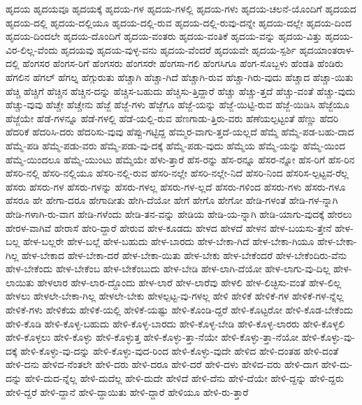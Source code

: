 {ಹೃದಯ
ಹೃದಯವೂ
ಹೃದಯಕ್ಕೆ
ಹೃದಯ-ಗಳ
ಹೃದಯ-ಗಳಲ್ಲಿ
ಹೃದಯ-ಗಳು
ಹೃದಯ-ಚಲನೆ-ಯೊಂದಿಗೆ
ಹೃದಯದ
ಹೃದಯ-ದಲ್ಲಿ
ಹೃದಯ-ದಲ್ಲಿಯೂ
ಹೃದಯ-ದಲ್ಲಿ-ರುವ
ಹೃದಯ-ದಲ್ಲಿ-ರುವು-ದನ್ನೇ
ಹೃದಯ-ದಲ್ಲೇ
ಹೃದಯ-ದಿಂದ
ಹೃದಯ-ದಿಂದಲೇ
ಹೃದಯ-ದೊಂದಿಗೆ
ಹೃದಯ-ವಂತರು
ಹೃದಯ-ವಂತಿಕೆ
ಹೃದಯ-ವನ್ನು
ಹೃದಯ-ವಿತ್ತು
ಹೃದಯ-ವಿರ-ಲಿಲ್ಲ-ವೆಂದು
ಹೃದಯವು
ಹೃದಯ-ವುಳ್ಳ-ವನು
ಹೃದಯ-ವೆಂದರೆ
ಹೃದಯವೇ
ಹೃದಯ-ಸ್ಪರ್ಶಿ
ಹೃದಯಾಂತರಾಳ-ದಲ್ಲಿ
ಹೆಂಗಸರ
ಹೆಂಗಸ-ರಿಗೆ
ಹೆಂಗಸರು
ಹೆಂಗಸರೇ
ಹೆಂಗಸಾ-ಗಲಿ
ಹೆಂಗಸಿಗೂ
ಹೆಂಗ-ಸೊಬ್ಬಳು
ಹೆಂಡತಿ
ಹೆಂಡಿರು
ಹೆಗಲಿನ
ಹೆಗಲ್
ಹೆಗಲ್ನ
ಹೆಗ್ಗುರುತು
ಹೆಚ್ಚಾಗಿ
ಹೆಚ್ಚಾ-ಗಿದೆ
ಹೆಚ್ಚಾಗಿ-ರುವ
ಹೆಚ್ಚಾ-ಗಿರು-ವುದು
ಹೆಚ್ಚಾದ
ಹೆಚ್ಚಾ-ಯಿತು
ಹೆಚ್ಚಿ
ಹೆಚ್ಚಿಗೆ
ಹೆಚ್ಚಿನ
ಹೆಚ್ಚಿನ-ದನ್ನು
ಹೆಚ್ಚಿಸ-ಬಹುದು
ಹೆಚ್ಚಿಸು-ತ್ತಿದ್ದಾರೆ
ಹೆಚ್ಚು
ಹೆಚ್ಚು-ತ್ತದೆ
ಹೆಚ್ಚು-ವಂತೆ
ಹೆಚ್ಚು-ವುದು
ಹೆಚ್ಚು-ವುವು
ಹೆಚ್ಚೇ
ಹೆಚ್ಚೇನು
ಹೆಜ್ಜೆ
ಹೆಜ್ಜೆ-ಗಳು
ಹೆಜ್ಜೆಗೂ
ಹೆಜ್ಜೆ-ಯನ್ನು
ಹೆಜ್ಜೆ-ಯಿಟ್ಟಿ-ರುವ
ಹೆಜ್ಜೆ-ಯಿಡಿಸಿ
ಹೆಜ್ಜೆಯೂ
ಹೆಜ್ಜೆಯೇ
ಹೆಡೆ-ಗಳನ್ನೂ
ಹೆಡೆ-ಗಳಲ್ಲಿ
ಹೆಡೆ-ಯಲ್ಲಿ-ರುವ
ಹೆಣಗಾಡು-ತ್ತಿರು-ವರು
ಹೆಣೆಯಲ್ಪಟ್ಟಂತೆ
ಹೆಣ್ಣು
ಹೆದರಿ
ಹೆದರಿಕೆ
ಹೆದರಿಸಿ-ದರು
ಹೆದರಿಸು-ವುವು
ಹೆಪ್ಪು-ಗಟ್ಟಿದ್ದ
ಹೆಮ್ಮರ-ವಾಗು-ತ್ತದೆ-ಯಲ್ಲದೆ
ಹೆಮ್ಮೆ
ಹೆಮ್ಮೆ-ಪಡ-ಬಹು-ದಾದ
ಹೆಮ್ಮೆ-ಪಡಿ
ಹೆಮ್ಮೆ-ಪಡು-ವರು
ಹೆಮ್ಮೆ-ಪಡು-ವು-ದಕ್ಕೆ
ಹೆಮ್ಮೆ-ಪಡು-ವುದು
ಹೆಮ್ಮೆಯ
ಹೆಮ್ಮೆ-ಯನ್ನು
ಹೆಮ್ಮೆ-ಯಿಂದ
ಹೆಮ್ಮೆ-ಯಿಂದಲೂ
ಹೆಮ್ಮೆ-ಯುಂಟು
ಹೆಮ್ಮೆಯೇ
ಹೆಳು-ತ್ತಾರೆ
ಹೆಸ-ರನ್ನು
ಹೆಸ-ರನ್ನೂ
ಹೆಸರ-ನ್ನೋ
ಹೆಸ-ರಿಗೆ
ಹೆಸ-ರಿನ
ಹೆಸರಿ-ನಲ್ಲಿ
ಹೆಸರಿ-ನಲ್ಲಿಯೂ
ಹೆಸರಿ-ನಲ್ಲಿ-ರುವ
ಹೆಸರಿ-ನಲ್ಲೇ
ಹೆಸರಿ-ನಲ್ಲೇ-ನಿದೆ
ಹೆಸರಿ-ನಿಂದ
ಹೆಸರಿಸ-ಲ್ಪಟ್ಟವ-ರೆಲ್ಲ
ಹೆಸರು
ಹೆಸರು-ಗಳ
ಹೆಸರು-ಗಳನ್ನು
ಹೆಸರು-ಗಳಲ್ಲ
ಹೆಸರು-ಗಳ-ಲ್ಲದೆ
ಹೆಸರು-ಗಳಿಂದ
ಹೆಸರು-ಗಳು
ಹೆಸರು-ಗಳೂ
ಹೆಸರೂ
ಹೇ
ಹೇಗಾ-ದರೂ
ಹೇಗಾದೀತು
ಹೇಗಿ-ದೆಯೋ
ಹೇಗೆ
ಹೇಗೊ
ಹೇಗೋ
ಹೇಡಿ-ಗಳಂತೆ
ಹೇಡಿ-ಗಳ-ನ್ನಾಗಿ
ಹೇಡಿ-ಗಳಾಗಿ-ರು-ವಾಗ
ಹೇಡಿ-ಗಳೆಂದು
ಹೇಡಿ-ತನ-ವನ್ನು
ಹೇಡಿಯ
ಹೇಡಿ-ಯ-ನ್ನಾಗಿ
ಹೇಡಿ-ಯಾಗು-ವುದಕ್ಕೆ
ಹೇರಲು
ಹೇರಳ-ವಾಗಿವೆ
ಹೇರಾಸೆ
ಹೇರಿ-ದ್ದಾರೆ
ಹೇರುವ
ಹೇಳ-ಕೂಡದು
ಹೇಳದ
ಹೇಳದೆ
ಹೇಳನ
ಹೇಳ-ಬಯಸು-ತ್ತೇನೆ
ಹೇಳ-ಬಲ್ಲ
ಹೇಳ-ಬಲ್ಲರೇ
ಹೇಳ-ಬಲ್ಲೆ
ಹೇಳ-ಬಹುದು
ಹೇಳ-ಬಾರದು
ಹೇಳ-ಬೇಕಾ-ಗಿದೆ
ಹೇಳ-ಬೇಕಾ-ಗಿಯೂ
ಹೇಳ-ಬೇಕಾ-ಗಿಲ್ಲ
ಹೇಳ-ಬೇಕಾದ
ಹೇಳ-ಬೇಕಾ-ದರೆ
ಹೇಳ-ಬೇಕಾ-ಯಿತು
ಹೇಳ-ಬೇಕು
ಹೇಳ-ಬೇಕೆಂದರೆ
ಹೇಳ-ಬೇಕೆಂದಿರು-ವೆನು
ಹೇಳ-ಬೇಕೆಂದು
ಹೇಳ-ಬೇಕೆಂಬ
ಹೇಳ-ಬೇಕೆಂಬುದು
ಹೇಳ-ಬೇಡಿ
ಹೇಳ-ಲಾಗಿ-ದೆಯೋ
ಹೇಳ-ಲಾಗು-ವು-ದಿಲ್ಲ
ಹೇಳ-ಲಾಯಿತು
ಹೇಳಲಾರ
ಹೇಳ-ಲಾರ-ದ್ದೊಂದು
ಹೇಳ-ಲಾರೆ
ಹೇಳ-ಲಾರೆವು
ಹೇಳಲಿ
ಹೇಳ-ಲಿಚ್ಛಿಸು-ವಂತೆ
ಹೇಳ-ಲಿಲ್ಲ
ಹೇಳಲು
ಹೇಳಲೇ-ಬೇಕಾ-ಗಿಲ್ಲ
ಹೇಳಲೇ-ಬೇಕು
ಹೇಳಲ್ಪಟ್ಟ-ವು-ಗಳಲ್ಲ
ಹೇಳಿ
ಹೇಳಿಕೆ
ಹೇಳಿಕೆ-ಗಳ
ಹೇಳಿಕೆ-ಗಳ-ನ್ನೆಲ್ಲ
ಹೇಳಿಕೆ-ಗಳು
ಹೇಳಿಕೆಯ
ಹೇಳಿಕೆ-ಯಲ್ಲಿ
ಹೇಳಿಕೆ-ಯಷ್ಟು
ಹೇಳಿ-ಕೊಂಡಿ-ದ್ದರೆ
ಹೇಳಿ-ಕೊಟ್ಟರೋ
ಹೇಳಿ-ಕೊಡ-ಬೇಕೆಂದು
ಹೇಳಿ-ಕೊಡಿ
ಹೇಳಿ-ಕೊಳ್ಳ-ಬಹುದು
ಹೇಳಿ-ಕೊಳ್ಳ-ಬಾರದು
ಹೇಳಿ-ಕೊಳ್ಳ-ಬೇಡಿ
ಹೇಳಿ-ಕೊಳ್ಳ-ಲಾರರು
ಹೇಳಿ-ಕೊಳ್ಳಲಿ
ಹೇಳಿ-ಕೊಳ್ಳಲು
ಹೇಳಿ-ಕೊಳ್ಳು
ಹೇಳಿ-ಕೊಳ್ಳುತ್ತ
ಹೇಳಿ-ಕೊಳ್ಳು-ತ್ತಾ-ನೆಯೇ
ಹೇಳಿ-ಕೊಳ್ಳು-ತ್ತಾ-ನೆಯೋ
ಹೇಳಿ-ಕೊಳ್ಳು-ವು-ದಕ್ಕೆ
ಹೇಳಿ-ಕೊಳ್ಳು-ವು-ದನ್ನು
ಹೇಳಿ-ಕೊಳ್ಳು-ವುದ-ರಿಂದ
ಹೇಳಿ-ಕೊಳ್ಳು-ವುದೇ
ಹೇಳಿದ
ಹೇಳಿ-ದಂತಹ
ಹೇಳಿ-ದಂತೆ
ಹೇಳಿ-ದನು
ಹೇಳಿದ-ನೆಂತಲೇ
ಹೇಳಿ-ದರು
ಹೇಳಿ-ದರೂ
ಹೇಳಿ-ದರೆ
ಹೇಳಿ-ದಳು
ಹೇಳಿದ-ವರು
ಹೇಳಿ-ದಾಗ
ಹೇಳಿ-ದು-ದನ್ನು
ಹೇಳಿ-ದುದ-ನ್ನೆಲ್ಲ
ಹೇಳಿ-ದುದೆಲ್ಲ
ಹೇಳಿ-ದುದೇ
ಹೇಳಿದೆ
ಹೇಳಿ-ದೆನು
ಹೇಳಿ-ದೆಯೇ
ಹೇಳಿ-ದ್ದನ್ನು
ಹೇಳಿ-ದ್ದರು
ಹೇಳಿ-ದ್ದರೆ
ಹೇಳಿ-ದ್ದಾನೆ
ಹೇಳಿ-ದ್ದಾಯಿತು
ಹೇಳಿ-ದ್ದಾರೆ
ಹೇಳಿಯೂ
ಹೇಳಿ-ರು-ತ್ತಾರೆ
}
